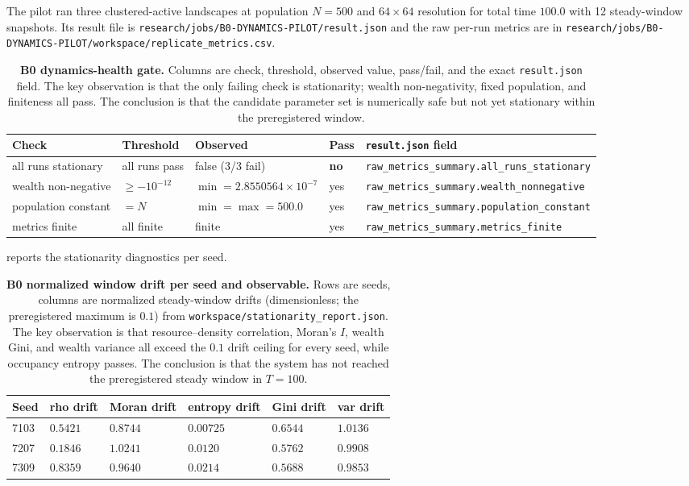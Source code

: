 \documentclass[11pt,a4paper]{article}
\newcommand{\code}[1]{\texttt{#1}}
\begin{document}
The pilot ran three clustered-active landscapes at population $N=500$ and
$64\times64$ resolution for total time $100.0$ with 12 steady-window snapshots.
Its result file is \code{research/jobs/B0-DYNAMICS-PILOT/result.json} and the
raw per-run metrics are in
\code{research/jobs/B0-DYNAMICS-PILOT/workspace/replicate\_metrics.csv}.

\begin{table}[htbp]
\centering
\small
\begin{tabular}{@{}lp{1.9cm}p{2.6cm}p{1.1cm}p{4.6cm}@{}}
\toprule
\textbf{Check} & \textbf{Threshold} & \textbf{Observed} & \textbf{Pass} & \textbf{\code{result.json} field} \\
\midrule
all runs stationary & all runs pass & false (3/3 fail) & \textbf{no} & \code{raw\_metrics\_summary.all\_runs\_stationary} \\
wealth non-negative & $\ge -10^{-12}$ & $\min=2.8550564\times10^{-7}$ & yes & \code{raw\_metrics\_summary.wealth\_nonnegative} \\
population constant & $=N$ & $\min=\max=500.0$ & yes & \code{raw\_metrics\_summary.population\_constant} \\
metrics finite & all finite & finite & yes & \code{raw\_metrics\_summary.metrics\_finite} \\
\bottomrule
\end{tabular}
\caption{\textbf{B0 dynamics-health gate.} Columns are check, threshold,
observed value, pass/fail, and the exact \code{result.json} field. The key
observation is that the only failing check is stationarity; wealth
non-negativity, fixed population, and finiteness all pass. The conclusion is
that the candidate parameter set is numerically safe but not yet stationary
within the preregistered window.}
\label{tab:b0-gate}
\end{table}

 reports the stationarity diagnostics per seed.

\begin{table}[htbp]
\centering
\small
\begin{tabular}{@{}llllll@{}}
\toprule
\textbf{Seed} & \textbf{rho drift} & \textbf{Moran drift} & \textbf{entropy drift} & \textbf{Gini drift} & \textbf{var drift} \\
\midrule
7103 & $0.5421$ & $0.8744$ & $0.00725$ & $0.6544$ & $1.0136$ \\
7207 & $0.1846$ & $1.0241$ & $0.0120$ & $0.5762$ & $0.9908$ \\
7309 & $0.8359$ & $0.9640$ & $0.0214$ & $0.5688$ & $0.9853$ \\
\bottomrule
\end{tabular}
\caption{\textbf{B0 normalized window drift per seed and observable.} Rows are
seeds, columns are normalized steady-window drifts (dimensionless; the
preregistered maximum is $0.1$) from
\code{workspace/stationarity\_report.json}. The key observation is that
resource--density correlation, Moran's $I$, wealth Gini, and wealth variance
all exceed the $0.1$ drift ceiling for every seed, while occupancy entropy
passes. The conclusion is that the system has not reached the preregistered
steady window in $T=100$.}
\label{tab:b0-stationarity}
\end{table}
\end{document}
